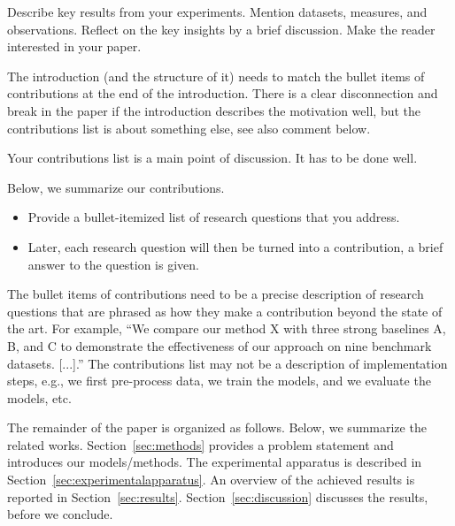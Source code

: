 \documentclass[manuscript, nonacm]{acmart}
\begin{document}
Describe key results from your experiments. 
Mention datasets, measures, and observations.
Reflect on the key insights by a brief discussion.
Make the reader interested in your paper.


\begin{tcolorbox}[title=Instruction: Write down your list of contributions.]
The introduction (and the structure of it) needs to match the bullet items of contributions at the end of the introduction. There is a clear disconnection and break in the paper if the introduction describes the motivation well, but the contributions list is about something else, see also comment below. 

Your contributions list is a main point of discussion. 
It has to be done well. 
\end{tcolorbox}

Below, we summarize our contributions.
\begin{itemize}
    \item Provide a bullet-itemized list of research questions that you address. 
    \item Later, each research question will then be turned into a contribution, \ie a brief answer to the question is given. 
\end{itemize}

\begin{tcolorbox}[title=Introduction What is a contribution item and what not.]
The bullet items of contributions need to be a precise description of research questions that are phrased as how they make a contribution beyond the state of the art. 
For example, ``We compare our method X with three strong baselines A, B, and C to demonstrate the effectiveness of our approach on nine benchmark datasets. [...].'' 
The contributions list may not be a description of implementation steps, e.g., we first pre-process data, we train the models, and we evaluate the models, etc. 


\end{tcolorbox}


The remainder of the paper is organized as follows.
%
Below, we summarize the related works.
Section~\ref{sec:methods} provides a problem statement and introduces our models/methods.
The experimental apparatus is described in Section~\ref{sec:experimentalapparatus}.
An overview of the achieved results is reported in Section~\ref{sec:results}. 
Section~\ref{sec:discussion} discusses the results, before we conclude.
\end{document}
